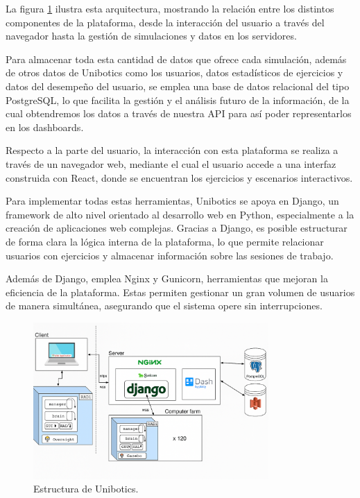 \documentclass[a4paper, 12pt]{book}
\begin{document}
La figura \ref{fig:arquitectura} ilustra esta arquitectura, mostrando la relación entre los distintos componentes de la plataforma, desde la interacción del usuario a través del navegador hasta la gestión de simulaciones y datos en los servidores.

Para almacenar toda esta cantidad de datos que ofrece cada simulación, además de otros datos de Unibotics como los usuarios, datos estadísticos de ejercicios y datos del desempeño del usuario, se emplea una base de datos relacional del tipo PostgreSQL, lo que facilita la gestión y el análisis futuro de la información, de la cual obtendremos los datos a través de nuestra API para así poder representarlos en los dashboards.

Respecto a la parte del usuario, la interacción con esta plataforma se realiza a través de un navegador web, mediante el cual el usuario accede a una interfaz construida con React, donde se encuentran los ejercicios y escenarios interactivos.

Para implementar todas estas herramientas, Unibotics se apoya en Django, un framework de alto nivel orientado al desarrollo web en Python, especialmente a la creación de aplicaciones web complejas. Gracias a Django, es posible estructurar de forma clara la lógica interna de la plataforma, lo que permite relacionar usuarios con ejercicios y almacenar información sobre las sesiones de trabajo.

Además de Django, emplea Nginx y Gunicorn, herramientas que mejoran la eficiencia de la plataforma. Estas permiten gestionar un gran volumen de usuarios de manera simultánea, asegurando que el sistema opere sin interrupciones.

\begin{figure}
  \centering
  \includegraphics[width=0.8\textwidth, keepaspectratio]{img/arquitectura.png}
  \caption{Estructura de Unibotics.}\label{fig:arquitectura}
\end{figure}
\end{document}
